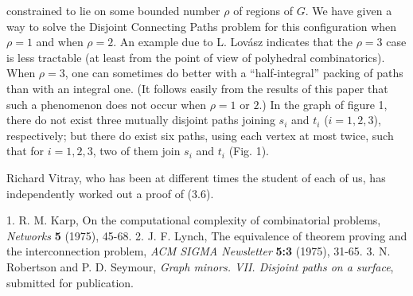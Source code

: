 
constrained to lie on some bounded number $\rho$ of regions of $G$. We have given a way to solve the Disjoint Connecting Paths problem for this configuration when $\rho = 1$ and when $\rho = 2$. An example due to L. Lov\'asz indicates that the $\rho = 3$ case is less tractable (at least from the point of view of polyhedral combinatorics). When $\rho = 3$, one can sometimes do better with a ``half-integral'' packing of paths than with an integral one. (It follows easily from the results of this paper that such a phenomenon does not occur when $\rho = 1$ or $2$.) In the graph of figure 1, there do not exist three mutually disjoint paths joining $s_i$ and $t_i$ ($i = 1, 2, 3$), respectively; but there do exist six paths, using each vertex at most twice, such that for $i = 1, 2, 3$, two of them join $s_i$ and $t_i$ (Fig. 1).


Richard Vitray, who has been at different times the student of each of us, has independently worked out a proof of (3.6).


1. R. M. Karp, On the computational complexity of combinatorial problems, \textit{Networks} \textbf{5} (1975), 45-68. 2. J. F. Lynch, The equivalence of theorem proving and the interconnection problem, \textit{ACM SIGMA Newsletter} \textbf{5:3} (1975), 31-65. 3. N. Robertson and P. D. Seymour, \textit{Graph minors. VII. Disjoint paths on a surface}, submitted for publication.
